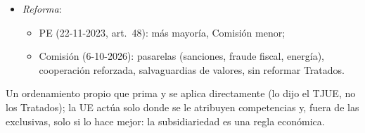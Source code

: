 \documentclass{article}
\begin{document}
\begin{columnas}
\begin{itemize}
  \begin{itemize}
  \item Montenegro, 21/33 capítulos (oct. 2026).
  \item Ucrania y Moldavia abren el bloque de fundamentales (junio de 2026) tras levantar Hungría el veto.
  \end{itemize}
\item \emph{Reforma}:
  \begin{itemize}
  \item PE (22-11-2023, art.~48): más mayoría, Comisión menor;
  \item Comisión (6-10-2026): pasarelas (sanciones, fraude fiscal, energía), cooperación reforzada, salvaguardias de valores, sin reformar Tratados.
  \end{itemize}
\end{itemize}

\begin{ideaclave}
Un ordenamiento propio que prima y se aplica directamente (lo dijo el TJUE, no los Tratados); la UE actúa solo donde se le atribuyen competencias y, fuera de las exclusivas, solo si lo hace mejor: la subsidiariedad es una regla económica.
\end{ideaclave}


\end{columnas}
\end{document}
